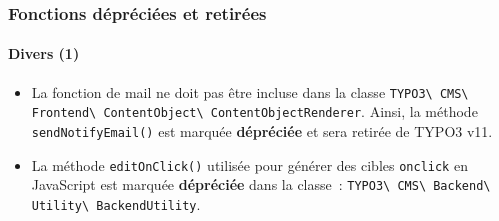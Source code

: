 \begin{frame}[fragile]
	\frametitle{Fonctions dépréciées et retirées}
	\framesubtitle{Divers (1)}

	\begin{itemize}
		\item La fonction de mail ne doit pas être incluse dans la classe\newline
			\small
				\texttt{TYPO3\textbackslash
					CMS\textbackslash
					Frontend\textbackslash
					ContentObject\textbackslash
					ContentObjectRenderer}.\newline
			\normalsize
			Ainsi, la méthode \texttt{sendNotifyEmail()} est marquée \textbf{dépréciée} et sera retirée de TYPO3 v11.

		\item La méthode \texttt{editOnClick()} utilisée pour générer des cibles \texttt{onclick}
			en JavaScript est marquée \textbf{dépréciée} dans la classe~:\newline
			\small
				\texttt{TYPO3\textbackslash
					CMS\textbackslash
					Backend\textbackslash
					Utility\textbackslash
					BackendUtility}.
			\normalsize

	\end{itemize}

\end{frame}


